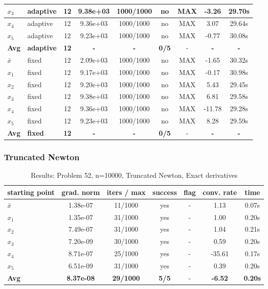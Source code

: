 \begin{longtable}{|l|l|c|c|c|c|c|c|c|}
\hline
$x_3$ & adaptive & 12 & 9.38e+03 & 1000/1000 & no & MAX & -3.26 & 29.70s \\
\hline
$x_4$ & adaptive & 12 & 9.36e+03 & 1000/1000 & no & MAX & 3.07 & 29.64s \\
\hline
$x_5$ & adaptive & 12 & 9.23e+03 & 1000/1000 & no & MAX & -0.77 & 30.08s \\
\hline
\hline\hline
\textbf{Avg} & \textbf{adaptive} & \textbf{12} & \textbf{-} & \textbf{-} & \textbf{0/5} & - & \textbf{-} & \textbf{-} \\
\hline\hline
\hline
$\bar{x}$ & fixed & 12 & 2.09e+03 & 1000/1000 & no & MAX & -1.65 & 30.32s \\
\hline
$x_1$ & fixed & 12 & 9.17e+03 & 1000/1000 & no & MAX & -0.17 & 30.98s \\
\hline
$x_2$ & fixed & 12 & 9.20e+03 & 1000/1000 & no & MAX & 5.43 & 29.45s \\
\hline
$x_3$ & fixed & 12 & 9.38e+03 & 1000/1000 & no & MAX & 6.81 & 29.58s \\
\hline
$x_4$ & fixed & 12 & 9.36e+03 & 1000/1000 & no & MAX & -11.78 & 29.28s \\
\hline
$x_5$ & fixed & 12 & 9.23e+03 & 1000/1000 & no & MAX & 8.28 & 29.59s \\
\hline
\hline\hline
\textbf{Avg} & \textbf{fixed} & \textbf{12} & \textbf{-} & \textbf{-} & \textbf{0/5} & - & \textbf{-} & \textbf{-} \\
\hline\hline
\end{longtable}


\subsubsection{Truncated Newton}

\begin{longtable}{|l|c|c|c|c|c|c|}
\caption{Results: Problem 52, n=10000, Truncated Newton, Exact derivatives} \\
\hline
\textbf{starting point} & \textbf{grad. norm} & \textbf{iters / max} & \textbf{success} & \textbf{flag} & \textbf{conv. rate} & \textbf{time} \\
\hline
\endfirsthead
\endhead
\endfoot
\hline
\endlastfoot
$\bar{x}$ & 1.38e-07 & 11/1000 & yes & - & 1.13 & 0.07s \\
\hline
$x_1$ & 1.35e-07 & 31/1000 & yes & - & 1.00 & 0.20s \\
\hline
$x_2$ & 7.49e-07 & 31/1000 & yes & - & 1.04 & 0.21s \\
\hline
$x_3$ & 7.20e-09 & 30/1000 & yes & - & 0.59 & 0.20s \\
\hline
$x_4$ & 8.71e-07 & 25/1000 & yes & - & -35.61 & 0.17s \\
\hline
$x_5$ & 6.51e-09 & 31/1000 & yes & - & 0.39 & 0.20s \\
\hline
\hline\hline
\textbf{Avg} & \textbf{8.37e-08} & \textbf{29/1000} & \textbf{5/5} & - & \textbf{-6.52} & \textbf{0.20s} \\
\hline\hline
\end{longtable}


